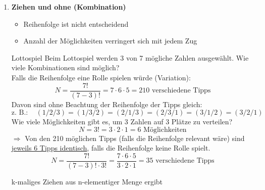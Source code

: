 \begin{note}
\begin{enumerate}[leftmargin=*]
    \item [3)] {
        \textcolor{myb}{\textbf{Ziehen  und ohne  (Kombination)}}
        \begin{itemize}[leftmargin=*]
            \item Reihenfolge ist nicht entscheidend
            \item Anzahl der Möglichkeiten verringert sich mit jedem Zug
        \end{itemize}
        \begin{Example}{Lottospiel}{}
            Beim Lottospiel werden 3 von 7 mögliche Zahlen ausgewählt. Wie viele Kombinationen sind möglich? \\[1.0ex]
            Falls die Reihenfolge eine Rolle spielen würde (Variation):\\
            \begin{equation*}
                N = \dfrac{7!}{(7 - 3)!} = 7 \cdot 6 \cdot 5 = 210 \text{ verschiedene Tipps}
            \end{equation*}
            Davon sind ohne Beachtung der Reihenfolge der Tipps gleich:\\
            \begin{equation*}
                \text{z. B.}: \quad (1 / 2 / 3) = (1 / 3 / 2) = (2 / 1 / 3) = (2 / 3 / 1) = (3 / 1 / 2) = (3 / 2 / 1)
            \end{equation*}
            Wie viele Möglichkeiten gibt es, um 3 Zahlen auf 3 Plätze zu verteilen?\\[1.0ex]
            \begin{equation*}
                N = 3! = 3 \cdot 2 \cdot 1 = 6 \text{ Möglichkeiten}
            \end{equation*}
            $\Rightarrow$ Von den 210 möglichen Tipps (falls die Reihenfolge relevant wäre) sind \underline{jeweils 6 Tipps identisch}, falls die Reihenfolge keine Rolle spielt.\\[1.0ex]
            \begin{equation*}
                N = \dfrac{7!}{(7 - 3)! \cdot 3!} = \dfrac{7 \cdot 6 \cdot 5}{3 \cdot 2 \cdot 1} = 35 \text{ verschiedene Tipps}
            \end{equation*}
        \end{Example}
            \begin{Corollary}{}{}
            k-maliges Ziehen aus n-elementiger Menge ergibt 

\end{Corollary}}
\end{enumerate}
\end{note}
